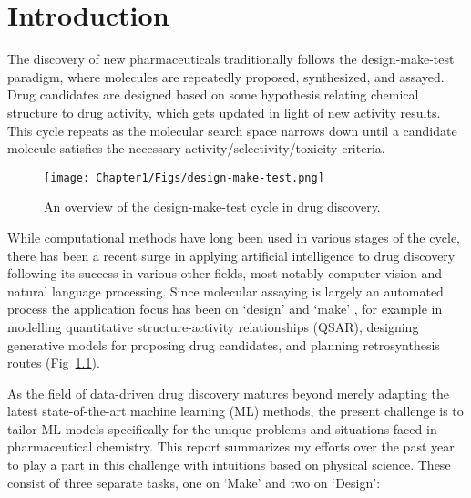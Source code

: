 \chapter{Introduction}
The discovery of new pharmaceuticals traditionally follows the design-make-test paradigm, where molecules are repeatedly proposed, synthesized, and assayed. Drug candidates are designed based on some hypothesis relating chemical structure to drug activity, which gets updated in light of new activity results. This cycle repeats as the molecular search space narrows down until a candidate molecule satisfies the necessary activity/selectivity/toxicity criteria.

\begin{figure}[!h] %
\centering
\texttt{[image: Chapter1/Figs/design-make-test.png]}
\caption{\label{fig:cycle} An overview of the design-make-test cycle in drug discovery.}
\end{figure}

While computational methods have long been used in various stages of the cycle, there has been a recent surge in applying artificial intelligence to drug discovery following its success in various other fields, most notably computer vision and natural language processing. Since molecular assaying is largely an automated process the application focus has been on `design' and `make' \cite{Coley2019AutonomousProgress}, for example in modelling quantitative structure-activity relationships (QSAR), designing generative models for proposing drug candidates, and planning retrosynthesis routes (Fig~\ref{fig:cycle}). 

As the field of data-driven drug discovery matures beyond merely adapting the latest state-of-the-art machine learning (ML) methods, the present challenge is to tailor ML models specifically for the unique problems and situations faced in pharmaceutical chemistry. This report summarizes my efforts over the past year to play a part in this challenge with intuitions based on physical science. These consist of three separate tasks, one on `Make' and two on `Design':

